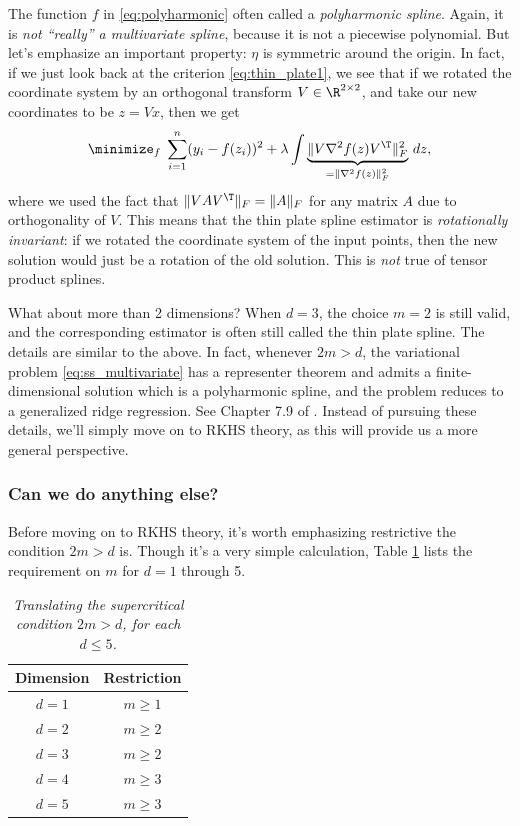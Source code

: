 \documentclass{article}
\begin{document}
The function $f$ in \eqref{eq:polyharmonic} often called a \emph{polyharmonic
  spline}. Again, it is \emph{not ``really'' a multivariate spline}, because it
is not a piecewise polynomial. But let's emphasize an important property: $\eta$
is symmetric around the origin. In fact, if we just look back at the criterion
\eqref{eq:thin_plate1}, we see that if we rotated the coordinate system by an
orthogonal transform $V \in \R^{2 \times 2}$, and take our new coordinates to be
$z=Vx$, then we get  
\[
\minimize_f \; \sum_{i=1}^n (y_i - f(z_i))^2 + \lambda \int \underbrace{\| V
  \nabla^2 f(z) V^\T\|_F^2}_{= \|\nabla^2 f(z)\|_F^2} \, dz,   
\]
where we used the fact that $\|V A V^\T\|_F = \|A\|_F$ for any matrix $A$ due to
orthogonality of $V$. This means that the thin plate spline estimator is
\emph{rotationally invariant}: if we rotated the coordinate system of the input
points, then the new solution would just be a rotation of the old solution. This
is \emph{not} true of tensor product splines. 

What about more than 2 dimensions? When $d=3$, the choice $m=2$ is still
valid, and the corresponding estimator is often still called the thin plate
spline. The details are similar to the above. In fact, whenever $2m > d$, the 
variational problem \eqref{eq:ss_multivariate} has a representer theorem and
admits a finite-dimensional solution which is a polyharmonic spline, and the
problem reduces to a generalized ridge regression. See Chapter 7.9 of
\citet{green1993nonparametric}. Instead of pursuing these details, we'll simply
move on to RKHS theory, as this will provide us a more general perspective. 

\subsubsection{Can we do anything else?}

Before moving on to RKHS theory, it's worth emphasizing restrictive the
condition $2m > d$ is. Though it's a very simple calculation, Table
\ref{tab:supercritical} lists the requirement on $m$ for $d=1$ through 5.  

\begin{table}[htb]
\centering
\begin{tabular}{c|c}
Dimension & Restriction \\
\hline
$d=1$ & $m \geq 1$ \\
$d=2$ & $m \geq 2$ \\
$d=3$ & $m \geq 2$ \\
$d=4$ & $m \geq 3$ \\
$d=5$ & $m \geq 3$ 
\end{tabular}
\caption{\it Translating the supercritical condition $2m > d$, for each $d 
  \leq 5$.} 
\label{tab:supercritical} 
\end{table}
\end{document}
